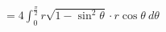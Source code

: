 \documentclass[preview]{standalone}
\begin{document}
\begin{align*}
=4\int_{0}^{\frac{\pi}{2}}r\sqrt{1-\sin^{2}\theta}\cdot r\cos\theta\ d\theta
\end{align*}
\end{document}
